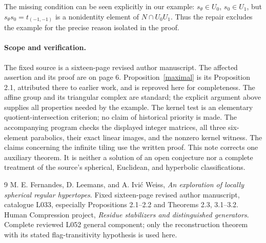 \documentclass[11pt,a4paper]{article}
\begin{document}
The missing condition can be seen explicitly in our example:
$s_\theta\in U_0$, $s_0\in U_1$, but
$s_\theta s_0=t_{(-1,-1)}$ is a nonidentity element of
$N\cap U_0U_1$. Thus the repair excludes the example for the
precise reason isolated in the proof.

\paragraph{Scope and verification.}
The fixed source is a sixteen-page revised author manuscript.
The affected assertion and its proof are on page 6. Proposition~\ref{maximal} is its Proposition 2.1,
attributed there to earlier work, and is reproved here for completeness.
The affine group and its triangular complex are standard; the
explicit argument above supplies all properties needed by the example.
The kernel test is an elementary quotient-intersection criterion;
no claim of historical priority is made. The accompanying program
checks the displayed integer matrices, all three six-element
parabolics, their exact linear images, and the nonzero kernel witness.
The claims concerning the infinite tiling use the written proof.
This note corrects one auxiliary theorem. It is neither a solution
of an open conjecture nor a complete treatment of the source's
spherical, Euclidean, and hyperbolic classifications.

\begin{thebibliography}{9}
M. E. Fernandes, D. Leemans, and A. Ivi\'c Weiss,
\emph{An exploration of locally spherical regular hypertopes}.
Fixed sixteen-page revised author manuscript, catalogue L033,
especially Propositions 2.1--2.2 and Theorems 2.3, 3.1--3.2.
Human Compression project, \emph{Residue stabilizers and distinguished generators}.
Complete reviewed L052 general component; only the reconstruction
theorem with its stated flag-transitivity hypothesis is used here.
\end{thebibliography}
\end{document}
